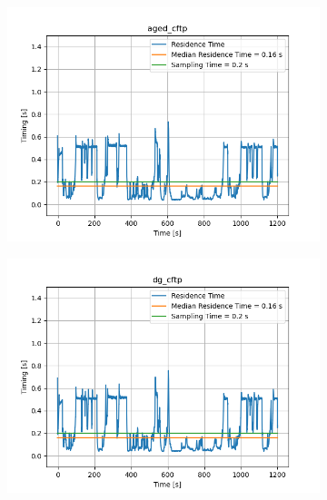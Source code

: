 \begin{figure}[H]
\begin{minipage}{0.49\textwidth}
    \end{minipage}
    \begin{minipage}{0.49\textwidth}
        \begin{figure}[H]
            \includegraphics[width=\textwidth]{figs/res_time/aged_cftp_timing_stuff.png}
        \end{figure}
    \end{minipage}
    \begin{minipage}{0.49\textwidth}
        \begin{figure}[H]
            \includegraphics[width=\textwidth]{figs/res_time/dg_cftp_timing_stuff.png}
        \end{figure}
    \end{minipage}
\end{figure}


